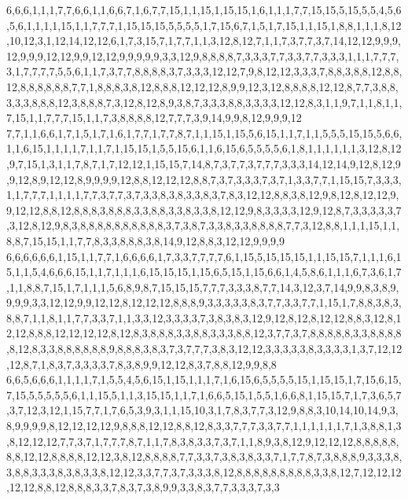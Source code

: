 6,6,6,1,1,1,7,7,6,6,1,1,6,6,7,1,6,7,7,15,1,1,15,1,15,15,1,6,1,1,1,7,7,15,15,5,15,5,5,4,5,6,5,6,1,1,1,1,15,1,1,7,7,7,1,15,15,15,5,5,5,5,1,7,15,6,7,1,5,1,7,15,1,1,15,1,8,8,1,1,1,8,12,10,12,3,1,12,14,12,12,6,1,7,3,15,7,1,7,7,1,1,3,12,8,12,7,1,1,7,3,7,7,3,7,14,12,12,9,9,9,12,9,9,9,12,12,9,9,12,12,9,9,9,9,9,3,3,12,9,8,8,8,8,7,3,3,3,7,7,3,3,7,7,3,3,3,1,1,1,7,7,7,3,1,7,7,7,7,5,5,6,1,1,7,3,7,7,8,8,8,8,3,7,3,3,3,12,12,7,9,8,12,12,3,3,3,7,8,8,3,8,8,12,8,8,12,8,8,8,8,8,8,7,7,1,8,8,8,3,8,12,8,8,8,12,12,12,8,9,9,12,3,12,8,8,8,8,12,12,8,7,7,3,8,8,3,3,3,8,8,8,12,3,8,8,8,7,3,12,8,12,8,9,3,8,7,3,3,3,8,8,3,3,3,3,12,12,8,3,1,1,9,7,1,1,8,1,1,7,15,1,1,7,7,7,15,1,1,7,3,8,8,8,8,12,7,7,7,3,9,14,9,9,8,12,9,9,9,12
7,7,1,1,6,6,1,7,1,5,1,7,1,6,1,7,7,1,7,7,8,7,1,1,15,1,15,5,6,15,1,1,7,1,1,5,5,5,15,15,5,6,6,1,1,6,15,1,1,1,1,7,1,1,7,1,15,15,1,5,5,15,6,1,1,6,15,6,5,5,5,5,6,1,8,1,1,1,1,1,1,3,12,8,12,9,7,15,1,3,1,1,7,8,7,1,7,12,12,1,15,15,7,14,8,7,3,7,7,3,7,7,7,3,3,3,14,12,14,9,12,8,12,9,9,12,8,9,12,12,8,9,9,9,9,12,8,8,12,12,12,8,8,7,3,7,3,3,3,7,3,7,1,3,3,7,7,1,15,15,7,3,3,3,1,1,7,7,7,1,1,1,1,7,7,3,7,7,3,7,3,3,8,3,8,3,3,8,3,7,8,3,12,12,8,8,3,8,12,9,8,12,8,12,12,9,9,12,12,8,8,12,8,8,8,3,8,8,8,3,3,8,8,3,3,8,3,3,8,12,12,9,8,3,3,3,3,12,9,12,8,7,3,3,3,3,3,7,3,12,8,12,9,8,3,8,8,8,8,8,8,8,8,8,8,3,7,3,8,7,3,3,8,3,3,8,8,8,8,7,7,3,12,8,8,1,1,1,15,1,1,8,8,7,15,15,1,1,7,7,8,3,3,8,8,8,3,8,14,9,12,8,8,3,12,12,9,9,9,9
6,6,6,6,6,6,1,15,1,1,7,7,1,6,6,6,6,1,7,3,3,7,7,7,7,6,1,15,5,15,15,15,1,1,15,15,7,1,1,1,6,15,1,1,5,4,6,6,6,15,1,1,7,1,1,1,6,15,15,15,1,15,6,5,15,1,15,6,6,1,4,5,8,6,1,1,1,6,7,3,6,1,7,1,1,8,8,7,15,1,7,1,1,1,5,6,8,9,8,7,15,15,15,7,7,7,3,3,3,8,7,7,14,3,12,3,7,14,9,9,8,3,8,9,9,9,9,3,3,12,12,9,9,12,12,8,12,12,12,8,8,8,9,3,3,3,3,3,8,3,7,7,3,3,7,7,1,15,1,7,8,8,3,8,3,8,8,7,1,1,8,1,1,7,7,3,3,7,1,1,3,3,12,3,3,3,3,7,3,8,3,8,3,12,9,12,8,12,8,12,12,8,8,3,12,8,12,12,8,8,8,12,12,12,12,8,12,8,3,8,8,8,3,3,8,8,3,3,3,8,8,12,3,7,7,3,7,8,8,8,8,8,3,3,8,8,8,8,8,12,8,3,3,8,8,8,8,8,8,9,8,8,8,3,8,3,7,3,7,7,7,3,8,3,12,12,3,3,3,3,3,8,3,3,3,3,1,3,7,12,12,12,8,7,1,8,3,7,3,3,3,3,7,8,3,8,9,9,12,12,8,3,7,8,8,12,9,9,8,8
6,6,5,6,6,6,1,1,1,1,7,1,5,5,4,5,6,15,1,15,1,1,1,7,1,6,15,6,5,5,5,5,15,1,15,15,1,7,15,6,15,7,15,5,5,5,5,5,6,1,1,15,5,1,1,3,15,15,1,1,7,1,6,6,5,15,1,5,5,1,6,6,8,1,15,15,7,1,7,3,6,5,7,3,7,12,3,12,1,15,7,7,1,7,6,5,3,9,3,1,1,15,10,3,1,7,8,3,7,7,3,12,9,8,8,3,10,14,10,14,9,3,8,9,9,9,9,8,12,12,12,12,9,8,8,8,12,12,8,8,12,8,3,3,7,7,7,3,3,7,7,1,1,1,1,1,1,7,1,3,8,8,1,3,8,12,12,12,7,7,3,7,1,7,7,7,8,7,1,1,7,8,3,8,3,3,7,3,7,1,1,8,9,3,8,12,9,12,12,12,8,8,8,8,8,8,8,12,12,8,8,8,8,12,12,3,8,12,8,8,8,8,7,7,3,3,7,3,8,3,8,3,3,7,1,7,7,8,7,3,8,8,8,9,3,3,3,8,3,8,8,3,3,3,8,3,8,3,3,8,12,12,3,3,7,7,3,7,3,3,3,8,12,8,8,8,8,8,8,8,8,8,3,3,8,12,7,12,12,12,12,12,8,8,12,8,8,8,3,3,7,8,3,7,3,8,9,9,3,3,8,3,7,7,3,3,3,7,3,3
